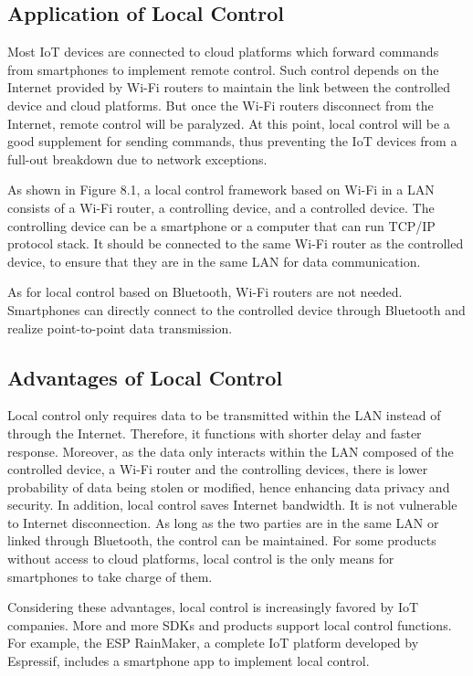 \documentclass[a4paper,12pt]{book}
\begin{document}
\subsection{Application of Local Control}
Most IoT devices are connected to cloud platforms which forward commands from smartphones to implement remote control. Such control depends on the Internet provided by Wi-Fi routers to maintain the link between the controlled device and cloud platforms. But once the Wi-Fi routers disconnect from the Internet, remote control will be paralyzed. At this point, local control will be a good supplement for sending commands, thus preventing the IoT devices from a full-out breakdown due to network exceptions.

As shown in Figure 8.1, a local control framework based on Wi-Fi in a LAN consists of a Wi-Fi router, a controlling device, and a controlled device. The controlling device can be a smartphone or a computer that can run TCP/IP protocol stack. It should be connected to the same Wi-Fi router as the controlled device, to ensure that they are in the same LAN for data communication.

As for local control based on Bluetooth, Wi-Fi routers are not needed. Smartphones can directly connect to the controlled device through Bluetooth and realize point-to-point data transmission.

\subsection{Advantages of Local Control}
Local control only requires data to be transmitted within the LAN instead of through the Internet. Therefore, it functions with shorter delay and faster response. Moreover, as the data only interacts within the LAN composed of the controlled device, a Wi-Fi router and the controlling devices, there is lower probability of data being stolen or modified, hence enhancing data privacy and security.
In addition, local control saves Internet bandwidth. It is not vulnerable to Internet disconnection. As long as the two parties are in the same LAN or linked through Bluetooth, the control can be maintained. For some products without access to cloud platforms, local control is the only means for smartphones to take charge of them.

Considering these advantages, local control is increasingly favored by IoT companies. More and more SDKs and products support local control functions. For example, the ESP RainMaker, a complete IoT platform developed by Espressif, includes a smartphone app to implement local control.
\end{document}
